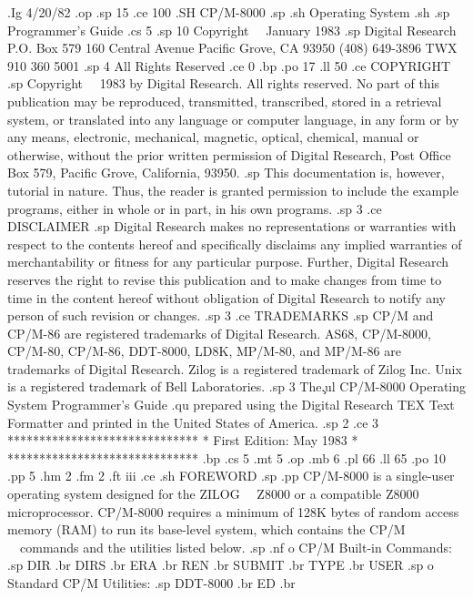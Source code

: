 .Ig
4/20/82
.op
.sp 15
.ce 100
.SH 
CP/M-8000
.sp
.sh
Operating System
.sh
.sp
Programmer's Guide
.cs 5
.sp 10
Copyright \ \ January 1983
.sp
Digital Research
P.O. Box 579
160 Central Avenue
Pacific Grove, CA 93950
(408) 649-3896
TWX 910 360 5001
.sp 4
All Rights Reserved
.ce 0
.bp
.po 17
.ll 50
.ce
COPYRIGHT
.sp
Copyright \ \ 1983 by Digital Research.  All rights reserved.
No part of this publication may be reproduced, transmitted,
transcribed, stored in a retrieval system, or translated
into any language or computer language, in any form or
by any means, electronic, mechanical, magnetic, optical,
chemical, manual or otherwise, without the prior written
permission of Digital Research, Post Office Box 579, Pacific
Grove, California, 93950.
.sp 
This documentation is, however, tutorial in nature.   Thus, the reader is
granted permission to include the example programs, either in whole
or in part, in his own programs.
.sp 3
.ce
DISCLAIMER
.sp
Digital Research makes no representations or warranties with
respect to the contents hereof and specifically disclaims
any implied warranties of merchantability or fitness for
any particular purpose.  Further, Digital Research reserves the
right to revise this publication and to make changes from
time to time in the content hereof without obligation of
Digital Research to notify any person of such revision or
changes.
.sp 3
.ce
TRADEMARKS
.sp
CP/M and CP/M-86 are registered trademarks of Digital Research.
AS68, CP/M-8000, CP/M-80, CP/M-86, DDT-8000, LD8K, MP/M-80, and MP/M-86 are 
trademarks of Digital Research.  Zilog is a registered trademark of 
Zilog Inc.  Unix is a registered trademark of Bell Laboratories.  
.sp 3
The\c 
.ul
CP/M-8000 Operating System Programmer's Guide 
.qu
\was prepared using the Digital Research TEX Text Formatter and printed
in the United States of America.
.sp 2
.ce 3
******************************
*  First Edition:  May 1983  *
******************************
.bp
.cs 5
.mt 5
.op
.mb 6
.pl 66
.ll 65
.po 10
.pp 5
.hm 2
.fm 2
.ft                              iii
.ce
.sh
FOREWORD
.sp
.pp
CP/M-8000 is a single-user operating system designed for the
ZILOG \ \ Z8000 or a compatible Z8000 microprocessor.  CP/M-8000
requires a minimum of 128K bytes of random access memory (RAM) to
run its base-level system, which contains the CP/M \ \ commands and
the utilities listed below.
.sp
.nf
   o  CP/M Built-in Commands:
.sp
        DIR
.br
        DIRS
.br
        ERA
.br
        REN
.br
        SUBMIT
.br
        TYPE
.br
        USER
.sp
   o  Standard CP/M Utilities:
.sp
        DDT-8000
.br
        ED
.br
